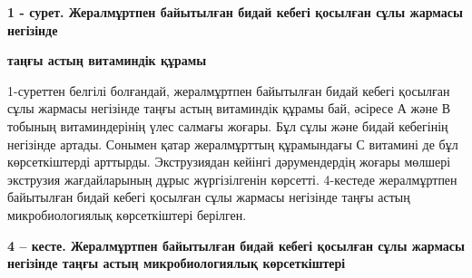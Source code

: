 {\bfseries 1 - сурет. Жералмұртпен байытылған бидай кебегі қосылған сұлы
жармасы негізінде}

{\bfseries таңғы астың витаминдік құрамы}

1-суреттен белгілі болғандай, жералмұртпен байытылған бидай кебегі
қосылған сұлы жармасы негізінде таңғы астың витаминдік құрамы бай,
әсіресе А және В тобының витаминдерінің үлес салмағы жоғары. Бұл сұлы
және бидай кебегінің негізінде артады. Сонымен қатар жералмұрттың
құрамындағы С витамині де бұл көрсеткіштерді арттырды. Экструзиядан
кейінгі дәрумендердің жоғары мөлшері экструзия жағдайларының дұрыс
жүргізілгенін көрсетті. 4-кестеде жералмұртпен байытылған бидай кебегі
қосылған сұлы жармасы негізінде таңғы астың микробиологиялық
көрсеткіштері берілген.

{\bfseries 4 -- кесте. Жералмұртпен байытылған бидай кебегі қосылған сұлы
жармасы негізінде таңғы астың микробиологиялық көрсеткіштері}


